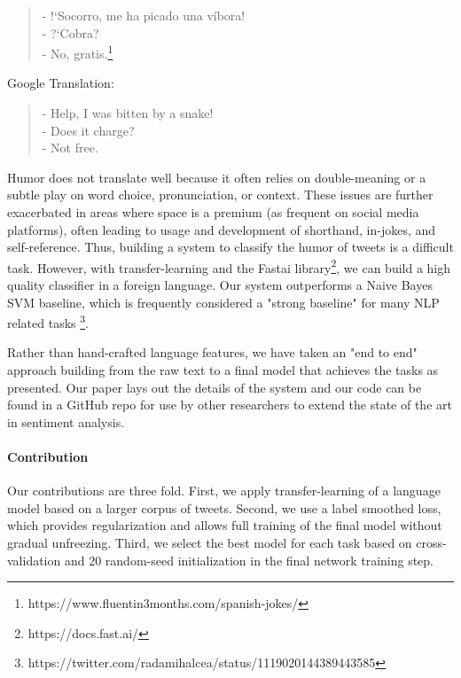 \documentclass[runningheads]{llncs}
\begin{document}
\begin{quote}
- !`Socorro, me ha picado una víbora!\\
- ?`Cobra?\\
- No, gratis.\footnote{https://www.fluentin3months.com/spanish-jokes/}
\end{quote}
Google Translation:
\begin{quote}
- Help, I was bitten by a snake!\\
- Does it charge?\\
- Not free.
\end{quote}
Humor does not translate well because it often relies on double-meaning or a subtle play on word choice, pronunciation, or context.  These issues are further exacerbated in areas where space is a premium (as frequent on social media platforms), often leading to usage and development of shorthand, in-jokes, and self-reference. Thus, building a system to classify the humor of tweets is a difficult task.  However, with transfer-learning and the Fastai library\footnote{https://docs.fast.ai/}, we can build a high quality classifier in a foreign language. Our system outperforms a Naive Bayes SVM baseline, which is frequently considered a "strong baseline" for many NLP related tasks \footnote{https://twitter.com/radamihalcea/status/1119020144389443585}.

Rather than hand-crafted language features, we have taken an "end to end" approach building from the raw text to a final model that achieves the tasks as presented.  Our paper lays out the details of the system and our code can be found in a GitHub repo for use by other researchers to extend the state of the art in sentiment analysis. 

\paragraph{Contribution} Our contributions are three fold.  First, we apply transfer-learning of a language model based on a larger corpus of tweets.  Second, we use a label smoothed loss, which provides regularization and allows full training of the final model without gradual unfreezing.  Third, we select the best model for each task based on cross-validation and 20 random-seed initialization in the final network training step.
\end{document}
